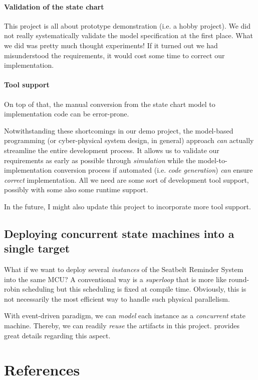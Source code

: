 \documentclass[12pt,a4paper]{scrartcl}
\begin{document}
	\paragraph{Validation of the state chart}
	This project is all about prototype demonstration (i.e. a hobby project). 
	We did not really systematically validate the model specification
	at the first place. What we did was pretty much thought experiments!
	If it turned out we had misunderstood the requirements, it would cost 
	some time to correct our implementation.
	
	\paragraph{Tool support}
		On top of that, the manual conversion from the state chart model to implementation code can be error-prone.
		
		Notwithstanding these shortcomings in our demo project, 
		the model-based programming (or cyber-physical system design, in general) approach \textit{can} actually streamline the entire development process.
		It allows us to validate our requirements as early as possible through \textit{simulation}
		while the model-to-implementation conversion process if automated (i.e. \textit{code generation}) \textit{can} ensure \textit{correct} implementation. 
		All we need are some sort of development tool support, possibly with some also some runtime support.
		
		In the future, I might also update this project to incorporate more tool support.
	
\subsection{Deploying concurrent state machines into a single target} \label{sec:concurrent}
	What if we want to deploy several \textit{instances} of the Seatbelt Reminder System into the same MCU?
	A conventional way is a \textit{superloop} that is more like round-robin scheduling but this scheduling is fixed at compile time. Obviously, this is not necessarily the most efficient way to handle such physical parallelism.
	
	With event-driven paradigm, we can \textit{model} each instance as a \textit{concurrent} state machine. Thereby, we can readily \textit{reuse} the artifacts in this project.
	\cite{Samek} provides great details regarding this aspect.

\section*{References}
\printbibliography[heading=none]
\newpage
\appendix
\end{document}
